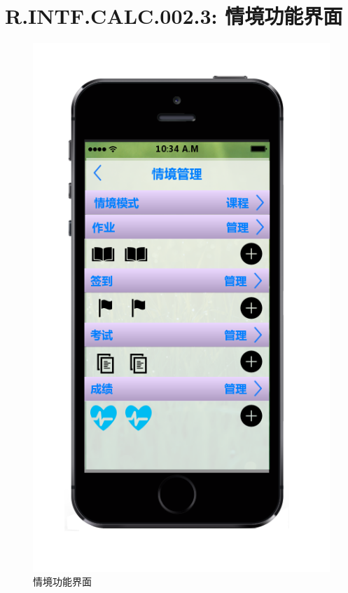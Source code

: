     \section{R.INTF.CALC.002.3: 情境功能界面}
    \begin{figure}[h]
        \centering
        \includegraphics[scale=0.6]{OutlineDesign/figures/情境功能界面.png}
        \caption{情境功能界面}
        \label{fig:server_flow}
    \end{figure}
    \newpage
